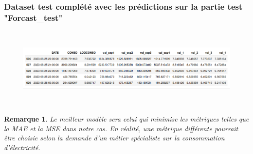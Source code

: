 \documentclass{beamer}
\newtheorem{rmq}{Remarque}
\theoremstyle{definition}
\begin{document}
\begin{frame}
	\frametitle{Dataset test complété avec les prédictions sur la partie test "Forcast\_test" }
	\begin{minipage}[t]{1\linewidth}
		\centering\hfill\\[-1cm]
		\begin{figure}	
			\includegraphics[scale =0.35]{34.png}	
		\end{figure}\hfill\\
	\begin{rmq}
		
		Le meilleur modèle sera celui qui minimise les métriques telles que la MAE et la MSE dans notre cas. En réalité, une métrique différente pourrait être choisie selon la demande d'un métier spécialiste sur la consommation d'électricité.
	\end{rmq}
	\end{minipage}	
\end{frame}
\end{document}
